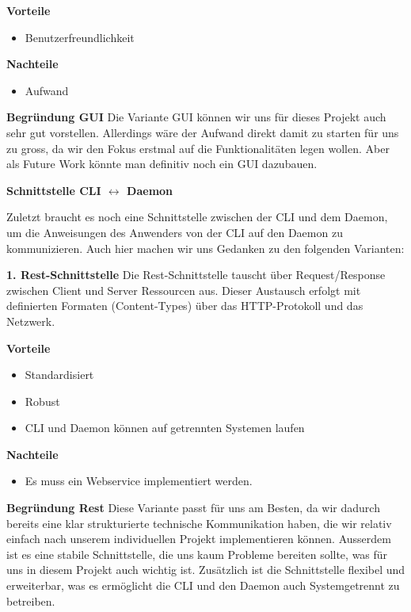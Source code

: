 \documentclass[a4paper,12pt]{report}
\begin{document}
    \textbf{Vorteile}
    \begin{itemize}
        \item Benutzerfreundlichkeit
    \end{itemize}

    \textbf{Nachteile}
    \begin{itemize}
        \item Aufwand
    \end{itemize}

    \textbf{Begründung GUI} Die Variante GUI können wir uns für dieses Projekt auch sehr gut vorstellen.
    Allerdings wäre der Aufwand direkt damit zu starten für uns zu gross, da wir den Fokus erstmal auf die Funktionalitäten legen wollen.
    Aber als Future Work könnte man definitiv noch ein GUI dazubauen.

        {\large\bfseries Schnittstelle CLI $\leftrightarrow$ Daemon}

    Zuletzt braucht es noch eine Schnittstelle zwischen der CLI und dem Daemon,
    um die Anweisungen des Anwenders von der CLI auf den Daemon zu kommunizieren.
    Auch hier machen wir uns Gedanken zu den folgenden Varianten:

    \textbf{1. Rest-Schnittstelle}
    Die Rest-Schnittstelle tauscht über Request/Response zwischen Client und Server Ressourcen aus.
    Dieser Austausch erfolgt mit definierten Formaten (Content-Types) über das HTTP-Protokoll und das Netzwerk.

    \textbf{Vorteile}
    \begin{itemize}
        \item Standardisiert
        \item Robust
        \item CLI und Daemon können auf getrennten Systemen laufen
    \end{itemize}

    \textbf{Nachteile}
    \begin{itemize}
        \item Es muss ein Webservice implementiert werden.
    \end{itemize}

    \textbf{Begründung Rest} Diese Variante passt für uns am Besten, da wir dadurch bereits eine klar strukturierte technische
    Kommunikation haben, die wir relativ einfach nach unserem individuellen Projekt implementieren können.
    Ausserdem ist es eine stabile Schnittstelle, die uns kaum Probleme bereiten sollte, was für uns in diesem Projekt auch wichtig ist.
    Zusätzlich ist die Schnittstelle flexibel und erweiterbar, was es ermöglicht die CLI und den Daemon auch Systemgetrennt zu betreiben.
\end{document}
